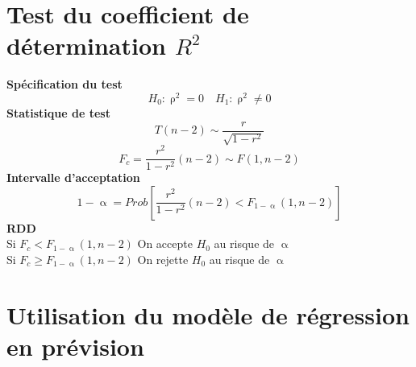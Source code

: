 \documentclass{article}
\begin{document}
\section{Test du coefficient de détermination $R^2$}
\textbf{Spécification du test}
\[H_0 : \uprho^2 = 0 \quad H_1 : \uprho^2 \neq 0 \]
\textbf{Statistique de test}
\[T(n-2) \sim \frac{r}{\sqrt{1-r^2}}\]
\[F_c = \frac{r^2}{1-r^2} (n-2) \sim F(1,n-2)\]
\textbf{Intervalle d'acceptation}
\[1 - \upalpha = Prob\left[\frac{r^2}{1-r^2} (n-2) < F_{1-\upalpha}(1,n-2)\right]\]
\textbf{RDD}\\
Si $F_c <  F_{1-\upalpha}(1,n-2)$ On accepte $H_0$ au risque de $\upalpha$ \\
Si $F_c \geq  F_{1-\upalpha}(1,n-2)$ On rejette $H_0$ au risque de $\upalpha$ \\

 \section{Utilisation du modèle de régression en prévision}
\end{document}
